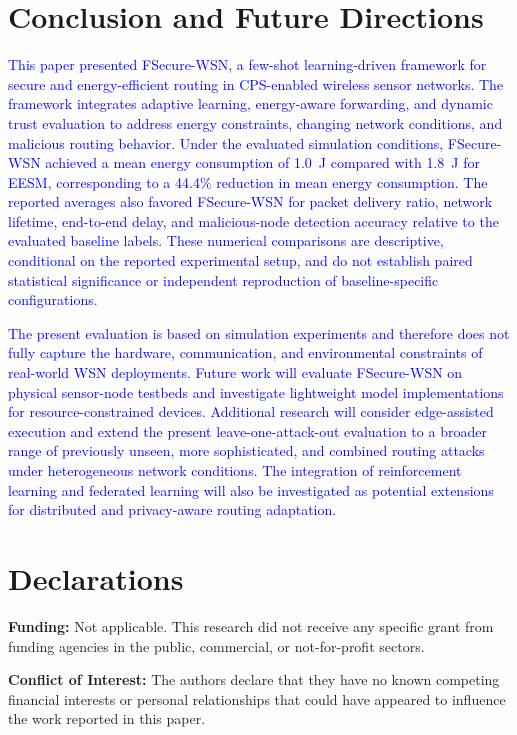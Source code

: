 \documentclass[pdflatex,sn-mathphys-num]{sn-jnl}
\begin{document}
\section{Conclusion and Future Directions}
\label{sec:conclusion}

\textcolor{blue}{This paper presented FSecure-WSN, a few-shot learning-driven framework for secure and energy-efficient routing in CPS-enabled wireless sensor networks. The framework integrates adaptive learning, energy-aware forwarding, and dynamic trust evaluation to address energy constraints, changing network conditions, and malicious routing behavior. Under the evaluated simulation conditions, FSecure-WSN achieved a mean energy consumption of 1.0~J compared with 1.8~J for EESM, corresponding to a 44.4\% reduction in mean energy consumption. The reported averages also favored FSecure-WSN for packet delivery ratio, network lifetime, end-to-end delay, and malicious-node detection accuracy relative to the evaluated baseline labels. These numerical comparisons are descriptive, conditional on the reported experimental setup, and do not establish paired statistical significance or independent reproduction of baseline-specific configurations.}

\textcolor{blue}{The present evaluation is based on simulation experiments and therefore does not fully capture the hardware, communication, and environmental constraints of real-world WSN deployments. Future work will evaluate FSecure-WSN on physical sensor-node testbeds and investigate lightweight model implementations for resource-constrained devices.} \textcolor{blue}{Additional research will consider edge-assisted execution and extend the present leave-one-attack-out evaluation to a broader range of previously unseen, more sophisticated, and combined
routing attacks under heterogeneous network conditions.} \textcolor{blue}{The integration of reinforcement learning and federated learning will also be investigated as potential extensions for distributed and privacy-aware routing adaptation.}

\section*{Declarations}

\textbf{Funding:}
Not applicable. This research did not receive any specific grant from funding agencies in the public, commercial, or not-for-profit sectors.

\medskip
\noindent
\textbf{Conflict of Interest:}
The authors declare that they have no known competing financial interests or personal relationships that could have appeared to influence the work reported in this paper.
\end{document}
